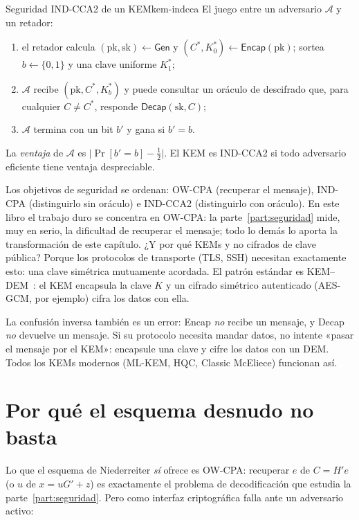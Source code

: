 \documentclass[11pt,a4paper,oneside]{report}
\begin{document}
\begin{definicion}{Seguridad IND-CCA2 de un KEM}{kem-indcca}
El juego entre un adversario $\mathcal{A}$ y un retador:
\begin{enumerate}[leftmargin=1.8em,itemsep=2pt]
  \item el retador calcula
        $(\mathrm{pk},\mathrm{sk})\leftarrow\textsf{Gen}$ y
        $(C^*,K_0^*)\leftarrow\textsf{Encap}(\mathrm{pk})$; sortea
        $b\leftarrow\{0,1\}$ y una clave uniforme $K_1^*$;
  \item $\mathcal{A}$ recibe $(\mathrm{pk},C^*,K_b^*)$ y puede
        consultar un oráculo de descifrado que, para cualquier
        $C\ne C^*$, responde $\textsf{Decap}(\mathrm{sk},C)$;
  \item $\mathcal{A}$ termina con un bit $b'$ y gana si $b'=b$.
\end{enumerate}
La \emph{ventaja} de $\mathcal{A}$ es
$\bigl|\Pr[b'=b]-\tfrac12\bigr|$. El KEM es IND-CCA2 si todo
adversario eficiente tiene ventaja despreciable.
\end{definicion}

Los objetivos de seguridad se ordenan: OW-CPA (recuperar el mensaje),
IND-CPA (distinguirlo sin oráculo) e IND-CCA2 (distinguirlo con oráculo).
En este libro el trabajo duro se concentra en OW-CPA: la
parte~\ref{part:seguridad} mide, muy en serio, la dificultad de
recuperar el mensaje; todo lo demás lo aporta la transformación de este
capítulo. ¿Y por qué KEMs y no cifrados de clave pública? Porque los
protocolos de transporte (TLS, SSH) necesitan exactamente esto: una
clave simétrica mutuamente acordada. El patrón estándar es
KEM--DEM~\cite{shoup2001}: el KEM encapsula la clave $K$ y un cifrado
simétrico autenticado (AES-GCM, por ejemplo) cifra los datos con ella.

\begin{trampa}
La confusión inversa también es un error: \textsf{Encap} \emph{no}
recibe un mensaje, y \textsf{Decap} \emph{no} devuelve un mensaje. Si su
protocolo necesita mandar datos, no intente «pasar el mensaje por el
KEM»: encapsule una clave y cifre los datos con un DEM. Todos los KEMs
modernos (ML-KEM, HQC, Classic McEliece) funcionan así.
\end{trampa}

\section{Por qué el esquema desnudo no basta}

Lo que el esquema de Niederreiter \emph{sí} ofrece es OW-CPA: recuperar
$e$ de $C=H'e$ (o $u$ de $x=uG'+z$) es exactamente el problema de
decodificación que estudia la parte~\ref{part:seguridad}. Pero como
interfaz criptográfica falla ante un adversario activo:
\end{document}
